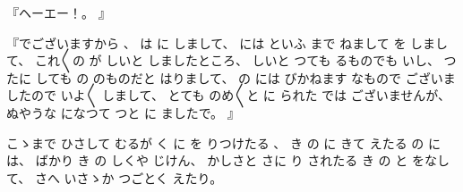 %
『ヘーエー！。
』

%
『でございますから
、
%
は
に
しまして、
%
には
といふ
まで
ねまして
を
しまして、
%
これ〳〵の
が
しいと
しましたところ、
%
しいと
つても
るものでも
いし、
%
つたに
しても
の
のものだと
はりまして、
%
%
の
には
びかねます
なもので
ございましたので
いよ〳〵
しまして、
%
とても
のめ〳〵と
に
られた
では
ございませんが、
%
ぬやうな
になつて
つと
に
ましたで。
』

%
こゝまで
ひさして
むるが
く
に
を
りつけたる
、
%
き
の
に
きて
えたる
の
には、
%
ばかり
き
の
しくや
じけん、
%
かしさと
さに
り
されたる
き
の
と
をなして、
%
さへ
いさゝか
つごとく
えたり。
